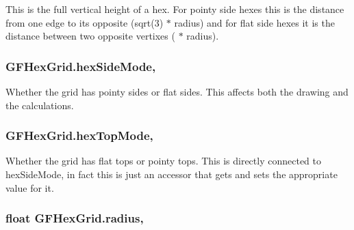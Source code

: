 This is the full vertical height of a hex. For pointy side hexes this is the distance from one edge to its opposite ({\ttfamily sqrt(3) $\ast$ radius}) and for flat side hexes it is the distance between two opposite vertixes ({ $\ast$ radius}). \hypertarget{class_g_f_hex_grid_a1c7aee0c19fe71879a1056d1c04be420_a1c7aee0c19fe71879a1056d1c04be420}{
\subsubsection[{hex\+Side\+Mode}]{ G\+F\+Hex\+Grid.\+hex\+Side\+Mode\hspace{0.3cm}{\ttfamily [get]}, {\ttfamily [set]}}}\label{class_g_f_hex_grid_a1c7aee0c19fe71879a1056d1c04be420_a1c7aee0c19fe71879a1056d1c04be420}
Whether the grid has pointy sides or flat sides. This affects both the drawing and the calculations.\hypertarget{class_g_f_hex_grid_a651e7fbf9e12e4d8fd31f21503aeb120_a651e7fbf9e12e4d8fd31f21503aeb120}{
\subsubsection[{hex\+Top\+Mode}]{ G\+F\+Hex\+Grid.\+hex\+Top\+Mode\hspace{0.3cm}{\ttfamily [get]}, {\ttfamily [set]}}}\label{class_g_f_hex_grid_a651e7fbf9e12e4d8fd31f21503aeb120_a651e7fbf9e12e4d8fd31f21503aeb120}
Whether the grid has flat tops or pointy tops. This is directly connected to {\ttfamily hex\+Side\+Mode}, in fact this is just an accessor that gets and sets the appropriate value for it. \hypertarget{class_g_f_hex_grid_a99701e2998e2b7305bb1bbe0c1ef9506_a99701e2998e2b7305bb1bbe0c1ef9506}{
\subsubsection[{radius}]{\setlength{\rightskip}{0pt plus 5cm}float G\+F\+Hex\+Grid.\+radius\hspace{0.3cm}{\ttfamily [get]}, {\ttfamily [set]}}}\label{class_g_f_hex_grid_a99701e2998e2b7305bb1bbe0c1ef9506_a99701e2998e2b7305bb1bbe0c1ef9506}
